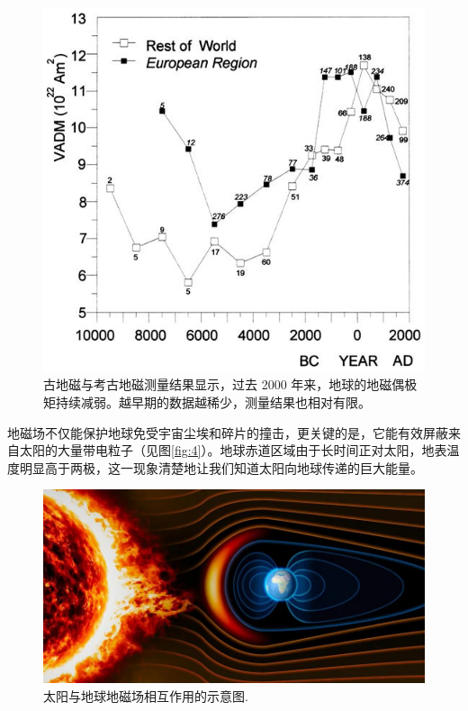 \documentclass[10pt,twocolumn,letterpaper]{article}
\begin{document}
\begin{figure}[t]
\begin{center}
   \includegraphics[width=1\linewidth]{paleo.png}
\end{center}
   \caption{古地磁与考古地磁测量结果显示，过去 2000 年来，地球的地磁偶极矩持续减弱。越早期的数据越稀少，测量结果也相对有限。\cite{11}}
\label{fig:3}
\label{fig:onecol}
\end{figure}
地磁场不仅能保护地球免受宇宙尘埃和碎片的撞击，更关键的是，它能有效屏蔽来自太阳的大量带电粒子（见图\ref{fig:4}）。地球赤道区域由于长时间正对太阳，地表温度明显高于两极，这一现象清楚地让我们知道太阳向地球传递的巨大能量。

\begin{figure}[t]
\begin{center}
   \includegraphics[width=1\linewidth]{solargeo.jpg}
\end{center}
   \caption{太阳与地球地磁场相互作用的示意图\cite{10}.}
\label{fig:4}
\label{fig:onecol}
\end{figure}
\end{document}
